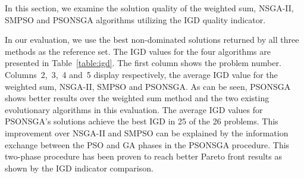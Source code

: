 \documentclass[10pt,journal,compsoc]{IEEEtran}
\begin{document}
In this section, we examine the solution quality of the weighted sum, NSGA-II, SMPSO and PSONSGA algorithms utilizing the IGD quality indicator.

In our evaluation, we use the best non-dominated solutions returned by all three methods as the reference set. The IGD values for the four algorithms are presented in Table~\ref{table:igd}. The first column shows the problem number. Columns~2,~3,~4 and~5 display respectively, the average IGD value for the weighted sum, NSGA-II, SMPSO and PSONSGA. As can be seen, PSONSGA shows better results over the weighted sum method and the two existing evolutionary algorithms in this evaluation. The average IGD values for PSONSGA's solutions achieve the best IGD in 25 of the 26 problems. This improvement over NSGA-II and SMPSO can be explained by the information exchange between the PSO and GA phases in the PSONSGA procedure. This two-phase procedure has been proven to reach better Pareto front results as shown by the IGD indicator comparison.
\end{document}
